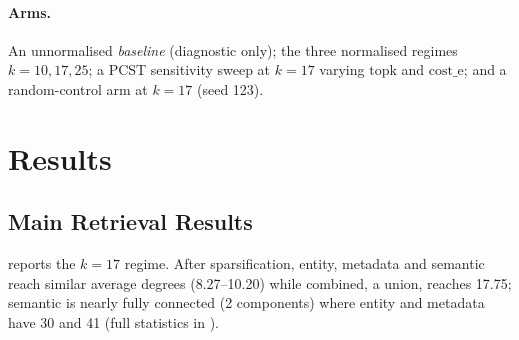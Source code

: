 \documentclass[11pt]{article}
\begin{document}
\paragraph{Arms.} An unnormalised \textit{baseline} (diagnostic only); the three normalised regimes $k{=}10,17,25$; a PCST sensitivity sweep at $k{=}17$ varying $\mathrm{topk}$ and $\mathrm{cost\_e}$; and a random-control arm at $k{=}17$ (seed 123).

\section{Results}

\subsection{Main Retrieval Results}

 reports the $k{=}17$ regime. After sparsification, entity, metadata and semantic reach similar average degrees (8.27--10.20) while combined, a union, reaches 17.75; semantic is nearly fully connected (2 components) where entity and metadata have 30 and 41 (full statistics in ).

\begin{table}[t]
  \centering
  \small
  \caption{Retrieval metrics, $k{=}17$, 2,255 evaluable queries; dense uses $K{=}13$. Oracle connectivity is a property of the graph, not the condition. Bold marks best recall and full-hit; we deliberately do not bold best precision (\S\ref{sec:size-control}).}
  \label{tab:main-results}
\end{table}
\end{document}
